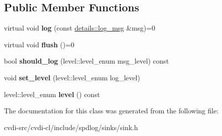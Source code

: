 \subsection*{Public Member Functions}
\begin{DoxyCompactItemize}
\item 
virtual void {\bfseries log} (const \hyperlink{structspdlog_1_1details_1_1log__msg}{details\+::log\+\_\+msg} \&msg)=0\hypertarget{classspdlog_1_1sinks_1_1sink_a51d8f34ad79064e0dc13c6013236e427}{}\label{classspdlog_1_1sinks_1_1sink_a51d8f34ad79064e0dc13c6013236e427}

\item 
virtual void {\bfseries flush} ()=0\hypertarget{classspdlog_1_1sinks_1_1sink_a8a0674ae3bca8f1617aef820e23a2ccd}{}\label{classspdlog_1_1sinks_1_1sink_a8a0674ae3bca8f1617aef820e23a2ccd}

\item 
bool {\bfseries should\+\_\+log} (level\+::level\+\_\+enum msg\+\_\+level) const \hypertarget{classspdlog_1_1sinks_1_1sink_aee70cdd1f77473d658840447d3f3afff}{}\label{classspdlog_1_1sinks_1_1sink_aee70cdd1f77473d658840447d3f3afff}

\item 
void {\bfseries set\+\_\+level} (level\+::level\+\_\+enum log\+\_\+level)\hypertarget{classspdlog_1_1sinks_1_1sink_a038a91409395dca18a7ccca81622fd83}{}\label{classspdlog_1_1sinks_1_1sink_a038a91409395dca18a7ccca81622fd83}

\item 
level\+::level\+\_\+enum {\bfseries level} () const \hypertarget{classspdlog_1_1sinks_1_1sink_a026877b46301b9bd0d22afc65c2f3eca}{}\label{classspdlog_1_1sinks_1_1sink_a026877b46301b9bd0d22afc65c2f3eca}

\end{DoxyCompactItemize}


The documentation for this class was generated from the following file\+:\begin{DoxyCompactItemize}
\item 
cvdi-\/src/cvdi-\/cl/include/spdlog/sinks/sink.\+h\end{DoxyCompactItemize}
